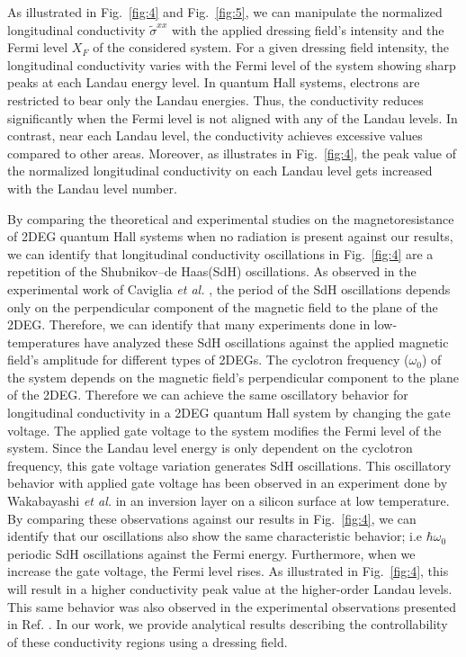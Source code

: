 \documentclass[
 reprint,
 amsmath,amssymb,
 aps,
 prb,
]{revtex4-2}
\begin{document}
As illustrated in Fig.~\ref{fig:4} and Fig.~\ref{fig:5}, we can manipulate the normalized longitudinal conductivity $\widetilde{\sigma}^{xx}$ with the applied dressing field's intensity and the Fermi level $X_F$ of the considered system.
For a given dressing field intensity, the longitudinal conductivity varies with  the Fermi level of the system showing sharp peaks at each Landau energy level.
In quantum Hall systems, electrons are restricted to bear only the Landau energies. Thus, the conductivity reduces significantly when the Fermi level is not aligned with any of the Landau levels. In contrast, near each Landau level, the conductivity achieves excessive values compared to other areas. Moreover, as illustrates in Fig.~\ref{fig:4}, the peak value of the normalized longitudinal conductivity on each Landau level gets increased with the Landau level number.

{\color{Red}
By comparing the theoretical \cite{ando72,ando74_1,ando74_2,ando74_3,ando74_4,ando82,endo09} and experimental \cite{endo09,wakabayashi78,ochiai190,mancoff96,arapov02,grbic04,caviglia10} studies on the magnetoresistance of 2DEG quantum Hall systems when no radiation is present against our results, we can identify that longitudinal conductivity oscillations in Fig.~\ref{fig:4} are a repetition of the Shubnikov–de Haas(SdH) oscillations.
As observed in the experimental work of Caviglia \textit{et al.} \cite{caviglia10}, the period of the SdH oscillations depends only on the perpendicular component of the magnetic field to the plane of the 2DEG.
Therefore, we can identify that many experiments done in low-temperatures \cite{endo09,ochiai190,mancoff96,arapov02,grbic04,caviglia10} have analyzed these SdH oscillations against the applied magnetic field's amplitude for different types of 2DEGs.
The cyclotron frequency ($\omega_0$) of the system depends on the magnetic field's perpendicular component to the plane of the 2DEG.
Therefore we can achieve the same oscillatory behavior for longitudinal conductivity in a 2DEG quantum Hall system by changing the gate voltage.
The applied gate voltage to the system modifies the Fermi level of the system.
Since the Landau level energy is only dependent on the cyclotron frequency, this gate voltage variation generates SdH oscillations.
This oscillatory behavior with applied gate voltage has been observed in an  experiment done by Wakabayashi \textit{et al.} \cite{wakabayashi78} in an inversion layer on a silicon surface at low temperature.
By comparing these observations against our results in Fig.~\ref{fig:4}, we can identify that our oscillations also show the same characteristic behavior; i.e  $\hbar\omega_0$ periodic SdH oscillations against the Fermi energy.
Furthermore, when we increase the gate voltage, the Fermi level rises. As illustrated in Fig.~\ref{fig:4}, this will result in a higher conductivity peak value at the higher-order Landau levels. This same behavior was also observed in the experimental observations presented in Ref. \cite{wakabayashi78}.
In our work, we provide analytical results describing the controllability of these conductivity regions using a dressing field.}
\end{document}
